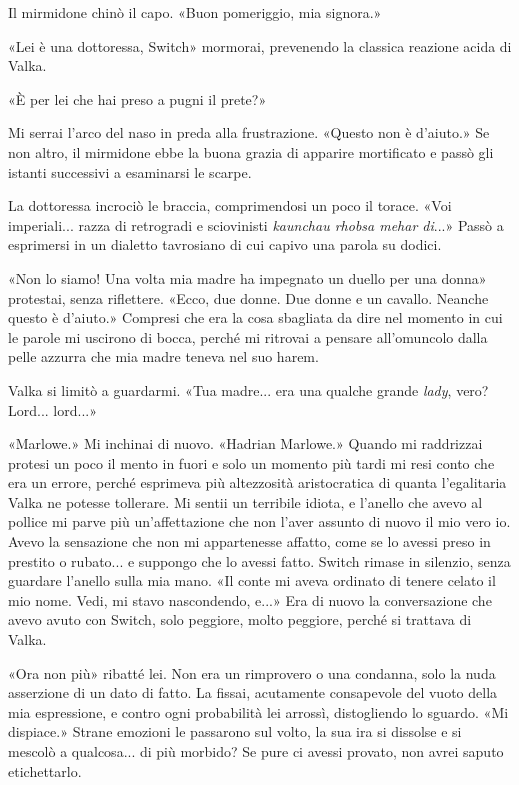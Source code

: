 Il mirmidone chinò il capo. «Buon pomeriggio, mia signora.»

«Lei è una dottoressa, Switch» mormorai, prevenendo la classica reazione
acida di Valka.

«È per lei che hai preso a pugni il prete?»

Mi serrai l'arco del naso in preda alla frustrazione. «Questo non è
d'aiuto.» Se non altro, il mirmidone ebbe la buona grazia di apparire
mortificato e passò gli istanti successivi a esaminarsi le scarpe.

La dottoressa incrociò le braccia, comprimendosi un poco il torace. «Voi
imperiali... razza di retrogradi e sciovinisti \emph{kaunchau rhobsa
	mehar di}...» Passò a esprimersi in un dialetto tavrosiano di cui capivo
una parola su dodici.

«Non lo siamo! Una volta mia madre ha impegnato un duello per una donna»
protestai, senza riflettere. «Ecco, due donne. Due donne e un cavallo.
Neanche questo è d'aiuto.» Compresi che era la cosa sbagliata da dire
nel momento in cui le parole mi uscirono di bocca, perché mi ritrovai a
pensare all'omuncolo dalla pelle azzurra che mia madre teneva nel suo
harem.

Valka si limitò a guardarmi. «Tua madre... era una qualche grande
\emph{lady}, vero? Lord... lord...»

«Marlowe.» Mi inchinai di nuovo. «Hadrian Marlowe.» Quando mi raddrizzai
protesi un poco il mento in fuori e solo un momento più tardi mi resi
conto che era un errore, perché esprimeva più altezzosità aristocratica
di quanta l'egalitaria Valka ne potesse tollerare. Mi sentii un
terribile idiota, e l'anello che avevo al pollice mi parve più
un'affettazione che non l'aver assunto di nuovo il mio vero io. Avevo la
sensazione che non mi appartenesse affatto, come se lo avessi preso in
prestito o rubato... e suppongo che lo avessi fatto. Switch rimase in
silenzio, senza guardare l'anello sulla mia mano. «Il conte mi aveva
ordinato di tenere celato il mio nome. Vedi, mi stavo nascondendo, e...»
Era di nuovo la conversazione che avevo avuto con Switch, solo peggiore,
molto peggiore, perché si trattava di Valka.

«Ora non più» ribatté lei. Non era un rimprovero o una condanna, solo la
nuda asserzione di un dato di fatto. La fissai, acutamente consapevole
del vuoto della mia espressione, e contro ogni probabilità lei arrossì,
distogliendo lo sguardo. «Mi dispiace.» Strane emozioni le passarono sul
volto, la sua ira si dissolse e si mescolò a qualcosa... di più morbido?
Se pure ci avessi provato, non avrei saputo etichettarlo.

